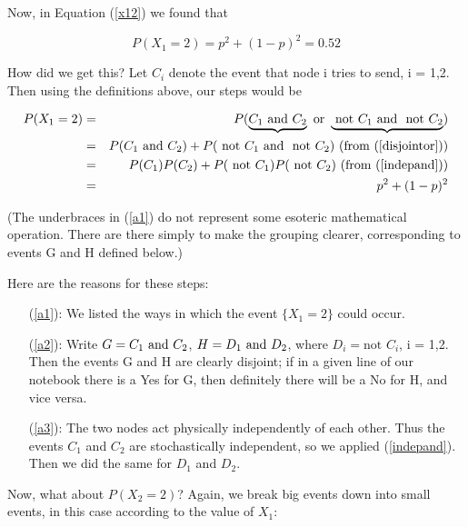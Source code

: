Now, in Equation (\ref{x12}) we found that 

\begin{equation}
P(X_1 = 2) = p^2 + (1-p)^2 = 0.52
\end{equation}

How did we get this?  Let $C_i$ denote the event that node i
tries to send, i = 1,2.  Then using the definitions above, our steps
would be

\begin{eqnarray}
P(X_1 = 2) 
&=& P(\underbrace{ C_1 {\rm ~and~} C_2 } {\rm ~or~ } 
\underbrace{ {\rm ~not~} C_1 {\rm ~and~} ~{\rm not}~ C_2 } ) \label{a1} \\ 
&=& P(C_1 {\rm ~and~} C_2) + P(~{\rm not}~ C_1 {\rm ~and~} ~{\rm not}~ C_2) 
\textrm{ (from (\ref{disjointor}))} \label{a2} \\ 
&=& P(C_1) P(C_2) + P(~{\rm not}~ C_1) P(~{\rm not}~ C_2) 
\textrm{ (from (\ref{indepand}))} \label{a3} \\ 
&=& p^2 + (1-p)^2
\end{eqnarray}

(The underbraces in (\ref{a1}) do not represent some esoteric
mathematical operation.  There are there simply to make the grouping
clearer, corresponding to events G and H defined below.)

Here are the reasons for these steps:

\begin{itemize}

\item[(\ref{a1}):]  We listed the ways in which the event $\{X_1 = 2\}$
could occur.  

\item[(\ref{a2}):]  Write $G = {C_1 {\rm ~and~} C_2}$, $H = {D_1 {\rm
~and~} D_2}$, where $D_i = \textrm{not } C_i$, i = 1,2.  Then the events G
and H are clearly disjoint; if in a given line of our notebook there is
a Yes for G, then definitely there will be a No for H, and vice versa.

\item[(\ref{a3}):]  The two nodes act physically independently of each
other.  Thus the events $C_1$ and $C_2$ are stochastically independent,
so we applied (\ref{indepand}).  Then we did the same for $D_1$ and
$D_2$.

\end{itemize}

Now, what about $P(X_2 = 2)$?  Again, we break big events down into
small events, in this case according to the value of $X_1$:

